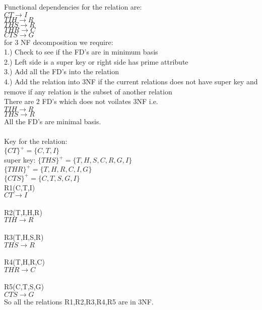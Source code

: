 Functional dependencies for the relation are:\\
$CT \rightarrow I$\\
$TIH \rightarrow R$\\
$THS \rightarrow R$\\
$THR \rightarrow C$\\
$CTS \rightarrow G$\\

for 3 NF decomposition we require:\\
1.) Check to see if the FD's are in minimum basis\\
2.) Left side is a super key or right side has prime attribute\\
3.) Add all the FD's into the relation\\
4.) Add the relation into 3NF if the current relations does not have super key and remove if any relation is the subset of another relation\\

There are 2 FD's which does not voilates 3NF i.e.\\ 
$TIH \rightarrow R$\\
$THS \rightarrow R$\\

All the FD's are minimal basis.\\ \\

Key for the relation:\\
$\{CT\}^+ = \{ C,T,I\}$ \\
super key: $\{THS\}^+ = \{ T,H,S,C,R,G,I\}$ \\
$\{THR\}^+ = \{ T,H,R,C,I,G\}$ \\
$\{CTS\}^+ = \{ C,T,S,G,I\}$ \\

R1(C,T,I)\\
$CT \rightarrow I$\\ \\
R2(T,I,H,R)\\
$TIH \rightarrow R$\\ \\
R3(T,H,S,R)\\
$THS \rightarrow R$\\ \\
R4(T,H,R,C)\\ 
$THR \rightarrow C$\\ \\
R5(C,T,S,G)\\
$CTS \rightarrow G$\\


So all the relations R1,R2,R3,R4,R5 are in 3NF.